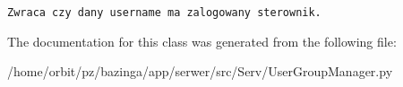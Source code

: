 \footnotesize\begin{verbatim}Zwraca czy dany username ma zalogowany sterownik.

\end{verbatim}
\normalsize
 

The documentation for this class was generated from the following file:\begin{CompactItemize}
\item 
/home/orbit/pz/bazinga/app/serwer/src/Serv/UserGroupManager.py\end{CompactItemize}
